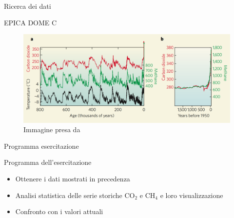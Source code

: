 \documentclass{beamer}
\begin{document}
\begin{frame}{Ricerca dei dati}
\begin{center}
EPICA DOME C
\end{center}
\begin{figure}
\begin{center}
\includegraphics[width=\textwidth ]{Pic/Overview.png}
\caption{Immagine presa da \cite{overview}}
\end{center}
\end{figure}

\end{frame}


\begin{frame}{Programma esercitazione}
\begin{center}
Programma dell'esercitazione
\end{center}
\begin{itemize}
\item Ottenere i dati mostrati in precedenza
\item Analisi statistica delle serie storiche CO$_{2}$ e CH$_4$ e loro visualizzazione
\item Confronto con i valori attuali 
\end{itemize}

\end{frame}
\end{document}
